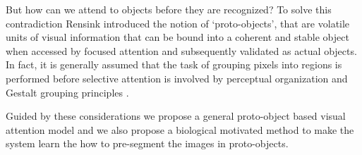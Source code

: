 \documentclass{llncs}
\makeatletter
\DeclareRobustCommand\onedot{\futurelet\@let@token\@onedot}
\def\@onedot{\ifx\@let@token.\else.\null\fi\xspace}
\def\eg{\emph{e.g}\onedot} \def\Eg{\emph{E.g}\onedot}
\def\etal{\emph{et al}\onedot}
\makeatother
\begin{document}
But how can we attend to objects before they are recognized?
To solve this contradiction Rensink \cite{RensinkORC97,Rensink00a}
introduced the notion of `proto-objects', that are volatile units
of visual information that can be bound into a coherent and
stable object when accessed by focused attention and
subsequently validated as actual objects.
In fact, it is generally assumed that the task of grouping pixels
into regions is performed before selective attention is involved
by perceptual organization and Gestalt grouping principles \cite{PalmerR94}.

Guided by these considerations we propose a general proto-object based
visual attention model and we also propose a biological motivated
method to make the system learn the how to pre-segment the images
in proto-objects.



\end{document}
